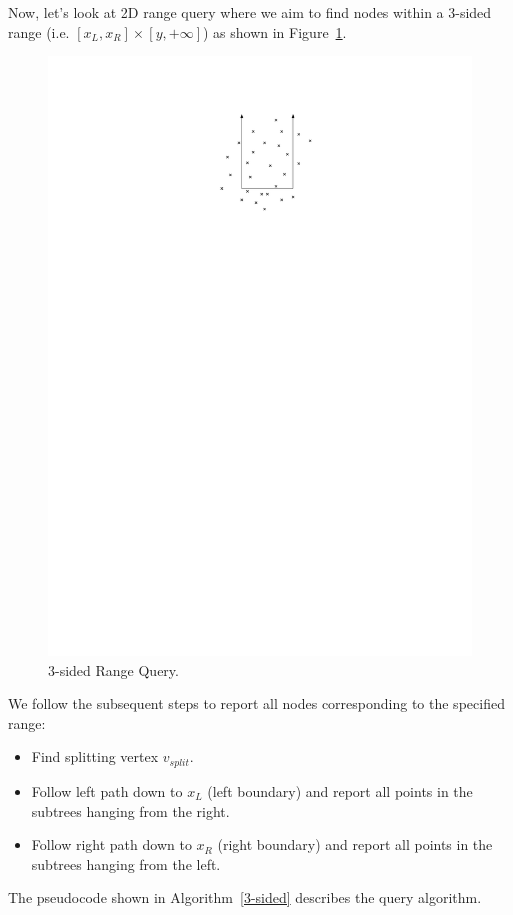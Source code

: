 Now, let's look at 2D range query where we aim to find nodes within a 3-sided range (i.e. $[x_L, x_R] \times [y, +\infty]$) as shown in Figure~\ref{fig:PST2}.
\begin{figure}[h!]
\begin{center}
  \includegraphics[scale = 1]{ipe/RQ2.pdf}
  \vspace{-0.1in}
  \caption{3-sided Range Query.}
  \label{fig:PST2}
\end{center}
\end{figure}


We follow the subsequent steps to report all nodes corresponding to the specified range:
\begin{itemize}
    \item Find splitting vertex $v_{split}$.
    \item Follow left path down to $x_L$ (left boundary) and report all points in the subtrees hanging from the right.
    \item Follow right path down to $x_R$ (right boundary) and report all points in the subtrees hanging from the left.
\end{itemize}
The pseudocode shown in Algorithm~\ref{3-sided} describes the query algorithm.

